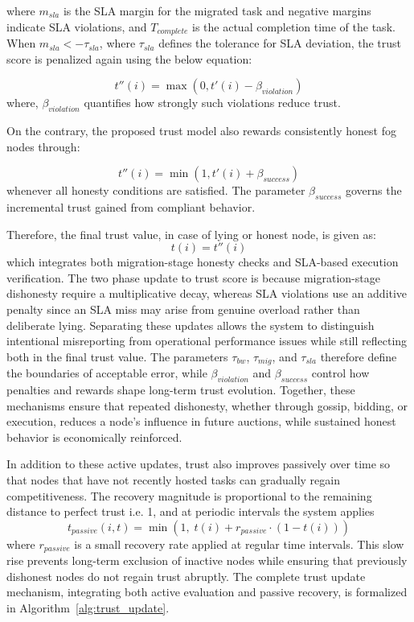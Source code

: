 \documentclass{article}
\begin{document}
where $m_{sla}$ is the SLA margin for the migrated task and negative margins indicate SLA violations, and $T_{complete}$ is the actual completion time of the task. When \(m_{sla}<-\tau_{sla}\), where \(\tau_{sla}\) defines the tolerance for SLA deviation, the trust score is penalized again using the below equation:
 
\begin{equation}
t''(i)=\max(0,t'(i)-\beta_{violation})
\label{eq:beta_violation}
\end{equation}
where,  \(\beta_{violation}\) quantifies how strongly such violations reduce trust.

On the contrary, the proposed trust model also rewards consistently honest fog nodes through: 
 
\begin{equation}
t''(i)=\min(1,t'(i)+\beta_{success})
\label{eq:beta_success}
\end{equation}
whenever all honesty conditions are satisfied. The parameter \(\beta_{success}\) governs the incremental trust gained from compliant behavior.

Therefore, the final trust value, in case of lying or honest node, is given as:
\begin{equation}
t(i)=t''(i)
\label{eq:final_trust}
\end{equation}
which integrates both migration-stage honesty checks and SLA-based execution verification. The two phase update to trust score is because migration-stage dishonesty require a multiplicative decay, whereas SLA violations use an additive penalty since an SLA miss may arise from genuine overload rather than deliberate lying. Separating these updates allows the system to distinguish intentional misreporting from operational performance issues while still reflecting both in the final trust value. The parameters \(\tau_{bw}\), \(\tau_{mig}\), and \(\tau_{sla}\) therefore define the boundaries of acceptable error, while \(\beta_{violation}\) and \(\beta_{success}\) control how penalties and rewards shape long-term trust evolution. Together, these mechanisms ensure that repeated dishonesty, whether through gossip, bidding, or execution, reduces a node’s influence in future auctions, while sustained honest behavior is economically reinforced.

In addition to these active updates, trust also improves passively over time so that nodes that have not recently hosted tasks can gradually regain competitiveness. The recovery magnitude is proportional to the remaining distance to perfect trust i.e. 1, and at periodic intervals the system applies  
\begin{equation}
t_{passive}(i,t)=\min\left(1,\; t(i)+r_{passive}\cdot (1-t(i))\right)
\label{eq:passive_recovery}
\end{equation}
where \(r_{passive}\) is a small recovery rate applied at regular time intervals. This slow rise prevents long-term exclusion of inactive nodes while ensuring that previously dishonest nodes do not regain trust abruptly. The complete trust update mechanism, integrating both active evaluation and passive recovery, is formalized in Algorithm~\ref{alg:trust_update}.
\end{document}
